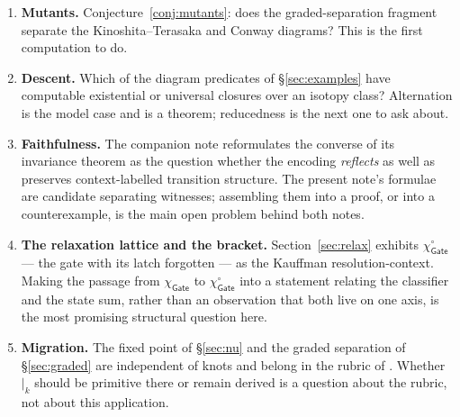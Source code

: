 \documentclass[11pt]{article}
\theoremstyle{definition}
\newcommand{\Gate}{\mathsf{Gate}}
\newcommand{\charf}[1]{\chi_{#1}}
\newcommand{\ssep}[1]{\mathbin{\vert_{#1}}}
\begin{document}
\begin{enumerate}[leftmargin=1.4em]
\item \textbf{Mutants.} Conjecture~\ref{conj:mutants}: does the
graded-separation fragment separate the Kinoshita--Terasaka and Conway diagrams?
This is the first computation to do.
\item \textbf{Descent.} Which of the diagram predicates of
\S\ref{sec:examples} have computable existential or universal closures over an
isotopy class? Alternation is the model case and is a theorem; reducedness is the
next one to ask about.
\item \textbf{Faithfulness.} The companion note reformulates the converse of
its invariance theorem as the question whether the encoding \emph{reflects} as
well as preserves context-labelled transition structure. The present note's
formulae are candidate separating witnesses; assembling them into a proof, or
into a counterexample, is the main open problem behind both notes.
\item \textbf{The relaxation lattice and the bracket.}
Section~\ref{sec:relax} exhibits $\charf{\Gate}^{\circ}$ --- the gate with its
latch forgotten --- as the Kauffman resolution-context. Making the passage from
$\charf{\Gate}$ to $\charf{\Gate}^{\circ}$ into a statement relating the
classifier and the state sum, rather than an observation that both live on one
axis, is the most promising structural question here.
\item \textbf{Migration.} The fixed point of \S\ref{sec:nu} and the graded
separation of \S\ref{sec:graded} are independent of knots and belong in the
rubric of \cite{omnibus}. Whether $\ssep{k}$ should be primitive there or remain
derived is a question about the rubric, not about this application.
\end{enumerate}
\end{document}
